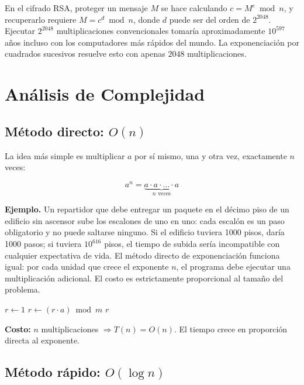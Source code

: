 \documentclass[twocolumn, 10pt]{article}
\begin{document}
En el cifrado RSA, proteger un mensaje $M$ se hace calculando
$c = M^e \bmod n$, y recuperarlo requiere $M = c^d \bmod n$, donde $d$
puede ser del orden de $2^{2048}$. Ejecutar $2^{2048}$
multiplicaciones convencionales tomaría aproximadamente $10^{597}$ años
incluso con los computadores más rápidos del mundo. La exponenciación por
cuadrados sucesivos resuelve esto con apenas $2048$ multiplicaciones.

\section{Análisis de Complejidad}

\subsection{Método directo: \texorpdfstring{$O(n)$}{O(n)}}

La idea más simple es multiplicar $a$ por sí mismo, una y otra vez,
exactamente $n$ veces:

\[
  a^n = \underbrace{a \cdot a \cdot \ldots \cdot a}_{n \text{ veces}}
\]

\textbf{Ejemplo.} Un repartidor que debe entregar un paquete en el
décimo piso de un edificio sin ascensor sube los escalones de uno en
uno: cada escalón es un paso obligatorio y no puede saltarse ninguno.
Si el edificio tuviera 1000 pisos, daría 1000 pasos; si tuviera
$10^{616}$ pisos, el tiempo de subida sería incompatible con cualquier
expectativa de vida. El método directo de exponenciación funciona igual:
por cada unidad que crece el exponente $n$, el programa debe ejecutar
una multiplicación adicional. El costo es estrictamente proporcional
al tamaño del problema.

\begin{algorithm}[H]
\caption{Exponenciación directa (lenta)}
\begin{algorithmic}[1]
  \State $r \gets 1$
    \State $r \gets (r \cdot a) \bmod m$  
  \EndFor
  \State \Return $r$
\EndFunction
\end{algorithmic}
\end{algorithm}

\textbf{Costo:} $n$ multiplicaciones $\Rightarrow T(n) = O(n)$. El tiempo
crece en proporción directa al exponente.

\subsection{Método rápido: \texorpdfstring{$O(\log n)$}{O(log n)}}
\end{document}
